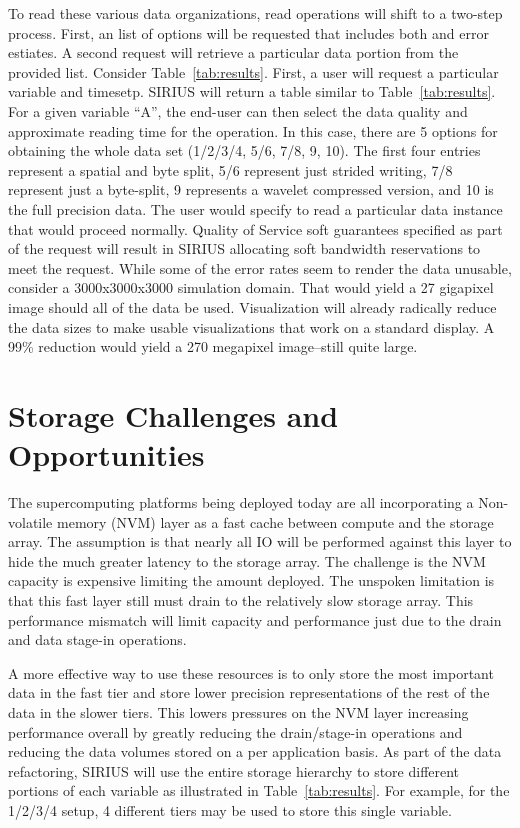 \documentclass[letterpaper,twocolumn,10pt]{article}
\begin{document}
To read these various data organizations, read operations will shift to a
two-step process. First, an list of options will be requested that includes
both and error estiates. A second request will retrieve a particular data
portion from the provided list. Consider Table~\ref{tab:results}.  First, a
user will request a particular variable and timesetp. SIRIUS will return a
table similar to Table~\ref{tab:results}. For a given variable ``A'',
the end-user can then select the data quality and approximate reading time for
the operation. In this case, there are 5 options for obtaining the whole data
set (1/2/3/4, 5/6, 7/8, 9, 10). The first four entries represent a spatial and
byte split, 5/6 represent just strided writing, 7/8 represent just a
byte-split, 9 represents a wavelet compressed version, and 10 is the full
precision data.  The user would specify to read a particular data instance that
would proceed normally.  Quality of Service soft guarantees specified as part
of the request will result in SIRIUS allocating soft bandwidth reservations to
meet the request. While some of the error rates seem to render the data
unusable, consider a 3000x3000x3000 simulation domain. That would yield a 27
gigapixel image should all of the data be used. Visualization will already
radically reduce the data sizes to make usable visualizations that work on a
standard display. A 99\% reduction would yield a 270 megapixel image--still
quite large.

\section{Storage Challenges and Opportunities}
\label{sec:storage}

The supercomputing platforms being deployed today are all incorporating a
Non-volatile memory (NVM) layer as a fast cache between compute and the storage
array. The assumption is that nearly all IO will be performed against this
layer to hide the much greater latency to the storage array. The challenge is
the NVM capacity is expensive limiting the amount deployed. The unspoken
limitation is that this fast layer still must drain to the relatively slow
storage array. This performance mismatch will limit capacity and performance
just due to the drain and data stage-in operations.

A more effective way to use these resources is to only store the most
important data in the fast tier and store lower precision representations of
the rest of the data in the slower tiers. This lowers pressures on the NVM
layer increasing performance overall by greatly reducing the drain/stage-in
operations and reducing the data volumes stored on a per application basis.
As part of the data refactoring, SIRIUS will use the entire storage hierarchy
to store different portions of each variable as illustrated in
Table~\ref{tab:results}. For example, for the 1/2/3/4 setup, 4 different tiers
may be used to store this single variable.
\end{document}
